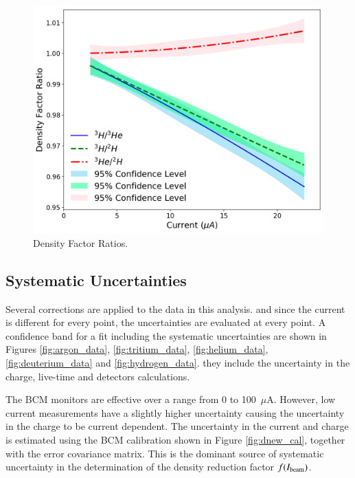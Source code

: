 \documentclass[review,numbers,sort&compress]{elsarticle}
\begin{document}
\begin{figure}[!h]
 \centering
 \includegraphics[width=\linewidth]{images/density_factor_ratios.pdf}
  \caption{Density Factor Ratios. }
  \label{fig:density_ratios}
\end{figure}

\subsection{Systematic Uncertainties}

Several corrections are applied to the data in this analysis. and since the current is different for every point, the uncertainties are evaluated at every point.  A confidence band for a fit including the systematic uncertainties are shown in Figures  \ref{fig:argon_data}, \ref{fig:tritium_data}, \ref{fig:helium_data}, \ref{fig:deuterium_data} and \ref{fig:hydrogen_data}. they include the uncertainty in the charge, live-time and detectors calculations.

The BCM monitors are effective over a range from 0 to 100~$\mu$A. However, low current measurements have a slightly higher 
uncertainty causing the uncertainty in the charge to be current dependent. The uncertainty in the current and charge is estimated 
using the BCM calibration shown in Figure \ref{fig:dnew_cal}, together with the error covariance matrix.
This is the dominant source of systematic uncertainty in the determination of the density reduction factor $f(I_{\rm{beam}})$.
\end{document}
